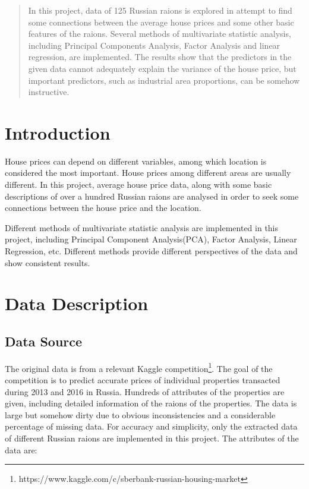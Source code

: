 \documentclass{article}
\begin{document}

\begin{abstract}
In this project, data of 125 Russian raions is explored in attempt to find some connections between the average house prices and some other basic features of the raions. Several methods of multivariate statistic analysis, including Principal Components Analysis, Factor Analysis and linear regression, are implemented. The results show that the predictors in the given data cannot adequately explain the variance of the house price, but important predictors, such as industrial area proportions, can be somehow instructive.
\end{abstract}

\section{Introduction}

House prices can depend on different variables, among which location is considered the most important. House prices among different areas are usually different. In this project, average house price data, along with some basic descriptions of over a hundred Russian raions are analysed in order to seek some connections between the house price and the location.

Different methods of multivariate statistic analysis are implemented in this project, including Principal Component Analysis(PCA), Factor Analysis, Linear Regression, etc. Different methods provide different perspectives of the data and show consistent results.

\section{Data Description}

\subsection{Data Source}

The original data is from a relevant Kaggle competition\footnote
{https://www.kaggle.com/c/sberbank-russian-housing-market}. The goal of the competition is to predict accurate prices of individual properties transacted during 2013 and 2016 in Russia. Hundreds of attributes of the properties are given, including detailed information of the raions of the properties. The data is large but somehow dirty due to obvious inconsistencies and a considerable percentage of missing data. For accuracy and simplicity, only the extracted data of different Russian raions are implemented in this project. The attributes of the data are:
\end{document}
